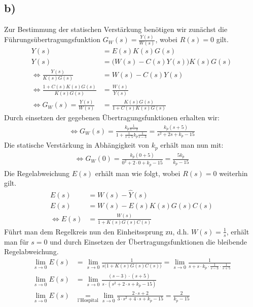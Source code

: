 \documentclass[11pt]{scrartcl} %
\begin{document}
\subsection*{b)}
Zur Bestimmung der statischen Verstärkung benötigen wir zunächst die Führungsübertragungsfunktion $G_W(s)=\frac{Y(s)}{W(s)}$, wobei $R(s)=0$ gilt.
\begin{align*}
	Y(s)&=E(s)K(s)G(s)\\
	Y(s)&=\bigl(W(s)-C(s)Y(s)\bigr)K(s)G(s)\\
	\Leftrightarrow\frac{Y(s)}{K(s)G(s)}&=W(s)-C(s)Y(s)\\
	\Leftrightarrow\frac{1+C(s)K(s)G(s)}{K(s)G(s)}&=\frac{W(s)}{Y(s)}\\
	\Leftrightarrow G_W(s)=\frac{Y(s)}{W(s)}&=\frac{K(s)G(s)}{1+C(s)K(s)G(s)}
\end{align*}
Durch einsetzen der gegebenen Übertragungsfunktionen erhalten wir:
\begin{align*}
	\Leftrightarrow G_W(s)=\frac{k_p\frac{1}{s-3}}{1+\frac{1}{s+5}k_p\frac{1}{s-3}}=\frac{k_p(s+5)}{s^2+2s+k_p-15}
\end{align*}
Die statische Verstärkung in Abhängigkeit von $k_p$ erhält man nun mit:
\begin{align*}
	\Leftrightarrow G_W(0)=\frac{k_p(0+5)}{0^2+2\cdot0+k_p-15}=\frac{5k_p}{k_p-15}
\end{align*}
Die Regelabweichung $E(s)$ erhält man wie folgt, wobei $R(s)=0$ weiterhin gilt.
\begin{align*}
	E(s)&=W(s)-\hat{Y}(s)\\
	E(s)&=W(s)-E(s)K(s)G(s)C(s)\\
	\Leftrightarrow E(s)&=\frac{W(s)}{1+K(s)G(s)C(s)}
\end{align*}
Führt man dem Regelkreis nun den Einheitssprung zu, d.h. $W(s)=\frac{1}{s}$, erhält man für $s=0$ und durch Einsetzen der Übertragungsfunktionen die bleibende Regelabweichung.
\begin{align*}
	\lim \limits_{s \to 0}E(s)&=\lim \limits_{s \to 0}\frac{1}{s\bigl(1+K(s)G(s)C(s)\bigr)}=\lim \limits_{s \to 0}\frac{1}{s+s\cdot k_p\cdot\frac{1}{s-3}\cdot\frac{1}{s+5}}\\
	\lim \limits_{s \to 0}E(s)&=\lim \limits_{s \to 0}\frac{(s-3)\cdot(s+5)}{s\cdot(s^2+2\cdot s+k_p-15)}\\
	\lim \limits_{s \to 0}E(s)&\underset{\text{l'Hospital}}{=}\lim \limits_{s \to 0}\frac{2\cdot s+2}{3\cdot s^2+4\cdot s+k_p-15}=\frac{2}{k_p-15}
\end{align*}
\end{document}
